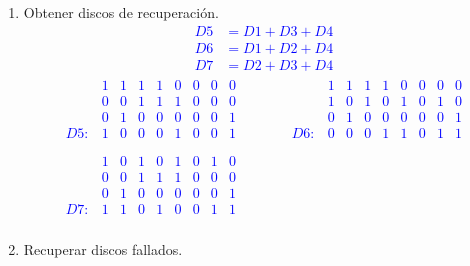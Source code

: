 \documentclass{templateNote}
\begin{document}
\begin{enumerate}
    \begin{enumerate}
        \item Obtener discos de recuperación.
        \textcolor{blue}{
            \begin{align*}
                D5 &= D1 + D3 + D4 \\
                D6 &= D1 + D2 + D4 \\
                D7 &= D2 + D3 + D4
            \end{align*}
            \begin{equation*}
                \begin{array}{cc}
                    \begin{array}{ccccccccc}
                            & 1 & 1 & 1 & 1 & 0 & 0 & 0 & 0 \\
                            & 0 & 0 & 1 & 1 & 1 & 0 & 0 & 0 \\
                            & 0 & 1 & 0 & 0 & 0 & 0 & 0 & 1 \\ \hline
                        D5: & 1 & 0 & 0 & 0 & 1 & 0 & 0 & 1 \\
                    \end{array} &\hspace{1cm}
                    \begin{array}{ccccccccc}
                            & 1 & 1 & 1 & 1 & 0 & 0 & 0 & 0 \\
                            & 1 & 0 & 1 & 0 & 1 & 0 & 1 & 0 \\
                            & 0 & 1 & 0 & 0 & 0 & 0 & 0 & 1 \\ \hline
                        D6: & 0 & 0 & 0 & 1 & 1 & 0 & 1 & 1 \\
                    \end{array} \\[1.5cm]
                    \begin{array}{ccccccccc}
                            & 1 & 0 & 1 & 0 & 1 & 0 & 1 & 0 \\
                            & 0 & 0 & 1 & 1 & 1 & 0 & 0 & 0 \\
                            & 0 & 1 & 0 & 0 & 0 & 0 & 0 & 1 \\ \hline
                        D7: & 1 & 1 & 0 & 1 & 0 & 0 & 1 & 1 \\
                    \end{array} &
                \end{array}
            \end{equation*}
        }
        \item Recuperar discos fallados.
        

\end{enumerate}
\end{enumerate}
\end{document}
